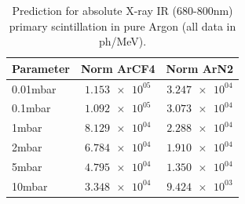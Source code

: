 \begin{table}
\caption{Prediction for absolute X-ray IR (680-800nm) primary scintillation in pure Argon (all data in ph/MeV).}
\label{tab:prediction_baja_presion}
\begin{tabular}{lSS}
\toprule
{Parameter} & {Norm ArCF4} & {Norm ArN2} \\
\midrule
0.01mbar & $\num{1.153e+05}$ & $\num{3.247e+04}$ \\
0.1mbar & $\num{1.092e+05}$ & $\num{3.073e+04}$ \\
1mbar & $\num{8.129e+04}$ & $\num{2.288e+04}$ \\
2mbar & $\num{6.784e+04}$ & $\num{1.910e+04}$ \\
5mbar & $\num{4.795e+04}$ & $\num{1.350e+04}$ \\
10mbar & $\num{3.348e+04}$ & $\num{9.424e+03}$ \\
\bottomrule
\end{tabular}
\end{table}
